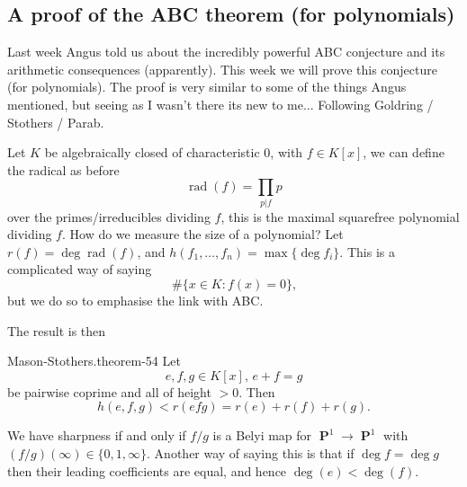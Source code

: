 \documentclass[10pt,]{book}
\numberwithin{equation}{section}
\newcommand{\lb}{[}
\newcommand{\rb}{]}
\DeclareMathOperator{\PP}{\mathbf{P}}
\newcommand{\lt}{<}
\newcommand{\gt}{>}
\begin{document}
\subsection[{A proof of the ABC theorem (for polynomials)}]{A proof of the ABC theorem (for polynomials)}\label{subsection-61}
\hypertarget{p-698}{}%
Last week Angus told us about the incredibly powerful ABC conjecture and its arithmetic consequences (apparently). This week we will prove this conjecture (for polynomials). The proof is very similar to some of the things Angus mentioned, but seeing as I wasn't there its new to me... Following Goldring / Stothers / Parab.%
\par
\hypertarget{p-699}{}%
Let \(K\) be algebraically closed of characteristic 0, with \(f \in K\lb x \rb\), we can define the radical as before%
\begin{equation*}
\operatorname{rad}(f) = \prod_{p | f} p
\end{equation*}
over the primes/irreducibles dividing \(f\), this is the maximal squarefree polynomial dividing \(f\). How do we measure the size of a polynomial? Let \(r(f) = \deg \operatorname{rad}(f)\), and \(h(f_1, \ldots, f_n) = \max\{\deg f_i\}\). This is a complicated way of saying%
\begin{equation*}
\#\{x \in K : f(x) = 0 \}\text{,}
\end{equation*}
but we do so to emphasise the link with ABC.%
\par
\hypertarget{p-700}{}%
The result is then%
\begin{theorem}{Mason-Stothers.}{}{theorem-54}%
\hypertarget{p-701}{}%
Let%
\begin{equation*}
e,f,g\in K[x],\,e + f = g
\end{equation*}
be pairwise coprime and all of height \(\gt 0\). Then%
\begin{equation*}
h(e,f,g) \lt r(efg) = r(e) + r(f)  + r(g)\text{.}
\end{equation*}
%
\par
\hypertarget{p-702}{}%
We have sharpness if and only if \(f/g\) is a Belyi map for \(\PP^1 \to \PP^1\) with \((f/g)(\infty) \in \{0,1,\infty\}\). Another way of saying this is that if \(\deg f = \deg g\) then their leading coefficients are equal, and hence \(\deg (e) \lt \deg (f)\).%
\end{theorem}
\end{document}
